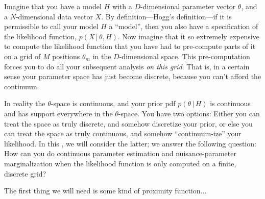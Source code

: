 \documentclass[12pt]{article}
\newcommand{\given}{\,|\,}
\begin{document}
Imagine that you have a model $H$ with a $D$-dimensional parameter vector $\theta$,
and a $N$-dimensional data vector $X$.
By definition---Hogg's definition---if it is permissible to call your model $H$
a ``model'', then you also have a specification of the likelihood function,
$p(X\given\theta, H)$.
Now imagine that it so extremely expensive to compute the likelihood function that
you have had to pre-compute parts of it on a grid of $M$ positions $\theta_m$ in
the $D$-dimensional space.
This pre-computation forces you to do all your subsequent analysis
\emph{on this grid}.
That is, in a certain sense your parameter space has just become discrete,
because you can't afford the continuum.

In reality the $\theta$-space is continuous, and your prior pdf $p(\theta\given H)$
is continuous and has support everywhere in the $\theta$-space.
You have two options:
Either you can treat the space as truly discrete, and somehow discretize your prior,
or else you can treat the space as truly continuous, and somehow ``continuum-ize'' your likelihood.
In this \documentname, we will consider the latter; we answer the following question:
How can you do continuous parameter estimation and nuisance-parameter marginalization
when the likelihood function is only computed on a finite, discrete grid?

The first thing we will need is some kind of proximity function...
\end{document}
